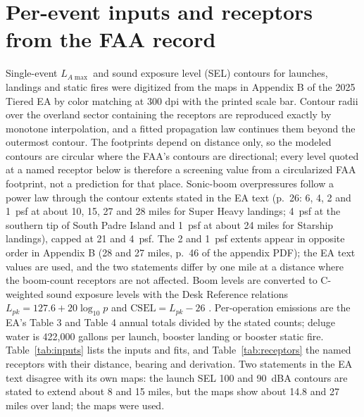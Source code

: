 \documentclass[11pt]{article}
\begin{document}
\section{Per-event inputs and receptors from the FAA record}
\label{sec:inputs}

Single-event $L_{A\max}$ and sound exposure level (SEL) contours for launches, landings and static fires were digitized from the maps in Appendix B of the 2025 Tiered EA \citep{appendixb2025} by color matching at 300 dpi with the printed scale bar. Contour radii over the overland sector containing the receptors are reproduced exactly by monotone interpolation, and a fitted propagation law continues them beyond the outermost contour. The footprints depend on distance only, so the modeled contours are circular where the FAA's contours are directional; every level quoted at a named receptor below is therefore a screening value from a circularized FAA footprint, not a prediction for that place. Sonic-boom overpressures follow a power law through the contour extents stated in the EA text (p.~26: 6, 4, 2 and 1~psf at about 10, 15, 27 and 28 miles for Super Heavy landings; 4~psf at the southern tip of South Padre Island and 1~psf at about 24 miles for Starship landings), capped at 21 and 4~psf. The 2 and 1~psf extents appear in opposite order in Appendix B (28 and 27 miles, p.~46 of the appendix PDF); the EA text values are used, and the two statements differ by one mile at a distance where the boom-count receptors are not affected. Boom levels are converted to C-weighted sound exposure levels with the Desk Reference relations $L_{pk} = 127.6 + 20\log_{10}p$ and $\mathrm{CSEL} = L_{pk} - 26$ \citep{deskref2020}. Per-operation emissions are the EA's Table 3 and Table 4 annual totals divided by the stated counts; deluge water is 422,000 gallons per launch, booster landing or booster static fire. Table~\ref{tab:inputs} lists the inputs and fits, and Table~\ref{tab:receptors} the named receptors with their distance, bearing and derivation. Two statements in the EA text disagree with its own maps: the launch SEL 100 and 90~dBA contours are stated to extend about 8 and 15 miles, but the maps show about \num{14.8} and \num{27} miles over land; the maps were used.

\begin{table}[htbp]
\caption{Per-operation inputs and footprint fits.}
\label{tab:inputs}
\centering\footnotesize
\tablePerOperation
\end{table}

\begin{table}[htbp]
\caption{Named receptors used in the comment and the attachment.}
\label{tab:receptors}
\centering\footnotesize
\tableReceptorsNamed
\end{table}
\end{document}
